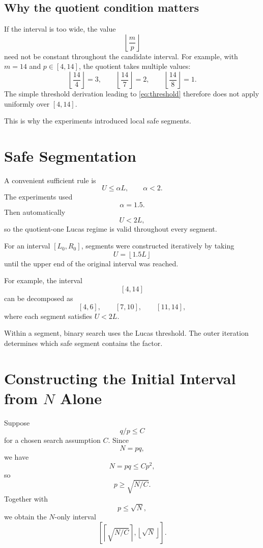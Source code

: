 \documentclass[11pt,a4paper]{article}
\begin{document}
\subsection{Why the quotient condition matters}

If the interval is too wide, the value
\[
\left\lfloor\frac{m}{p}\right\rfloor
\]
need not be constant throughout the candidate interval. For example, with $m=14$ and $p\in[4,14]$, the quotient takes multiple values:
\[
\left\lfloor\frac{14}{4}\right\rfloor=3,
\qquad
\left\lfloor\frac{14}{7}\right\rfloor=2,
\qquad
\left\lfloor\frac{14}{8}\right\rfloor=1.
\]
The simple threshold derivation leading to \eqref{eq:threshold} therefore does not apply uniformly over $[4,14]$.

This is why the experiments introduced local safe segments.

\section{Safe Segmentation}

A convenient sufficient rule is
\[
U\le \alpha L,
\qquad
\alpha<2.
\]
The experiments used
\[
\alpha=1.5.
\]
Then automatically
\[
U<2L,
\]
so the quotient-one Lucas regime is valid throughout every segment.

For an interval $[L_0,R_0]$, segments were constructed iteratively by taking
\[
U=\left\lfloor1.5L\right\rfloor
\]
until the upper end of the original interval was reached.

For example, the interval
\[
[4,14]
\]
can be decomposed as
\[
[4,6],
\qquad
[7,10],
\qquad
[11,14],
\]
where each segment satisfies $U<2L$.

Within a segment, binary search uses the Lucas threshold. The outer iteration determines which safe segment contains the factor.

\section{Constructing the Initial Interval from $N$ Alone}

Suppose
\[
q/p\le C
\]
for a chosen search assumption $C$. Since
\[
N=pq,
\]
we have
\[
N=pq\le Cp^2,
\]
so
\[
p\ge\sqrt{N/C}.
\]
Together with
\[
p\le\sqrt N,
\]
we obtain the $N$-only interval
\begin{equation}
\left[
\left\lceil\sqrt{N/C}\right\rceil,
\left\lfloor\sqrt N\right\rfloor
\right].
\label{eq:initialinterval}
\end{equation}
\end{document}
